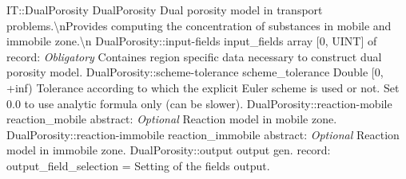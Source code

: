 \begin{RecordType}
	{IT::DualPorosity}
	{DualPorosity}
	{}%
	{}%
	{{{Dual porosity model in transport problems.{\textbackslash}nProvides computing the concentration of substances in mobile and immobile zone.{\textbackslash}n}%
}}
		\RecKey
			{DualPorosity::input-fields}
			{input{\_}fields}
			{{array [0, UINT] of }{record: }}{}
			{ \it{Obligatory}}
			{{{Containes region specific data necessary to construct dual porosity model.}%
}}
		\RecKey
			{DualPorosity::scheme-tolerance}
			{scheme{\_}tolerance}
			{{Double [0, +inf)}}{}
			{ }
			{{{Tolerance according to which the explicit Euler scheme is used or not.
Set 0.0 to use analytic formula only (can be slower).}%
}}
		\RecKey
			{DualPorosity::reaction-mobile}
			{reaction{\_}mobile}
			{{abstract: }}{}
			{ \it{Optional}}
			{{{Reaction model in mobile zone.}%
}}
		\RecKey
			{DualPorosity::reaction-immobile}
			{reaction{\_}immobile}
			{{abstract: }}{}
			{ \it{Optional}}
			{{{Reaction model in immobile zone.}%
}}
		\RecKey
			{DualPorosity::output}
			{output}
			{{gen. record: }}{{output{\_}field{\_}selection}{ = }}
			{ }
			{{{Setting of the fields output.}%
}}
\end{RecordType}
